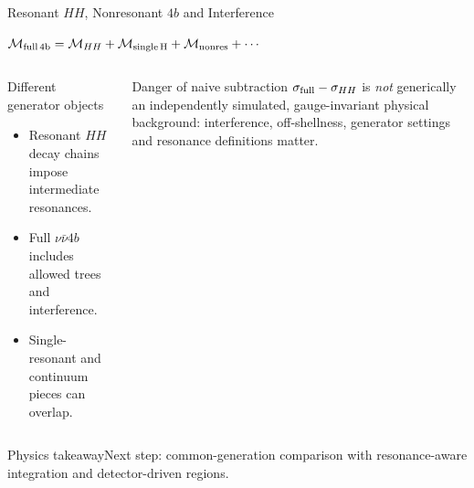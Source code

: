 \documentclass[aspectratio=1610,english]{beamer}
\newcommand{\src}[1]{\vfill{\par\color{black!65}\fontsize{6.4}{7.4}\selectfont\emph{Source:} #1\par}}
\newcommand{\key}[1]{\begin{alertblock}{Physics takeaway}\scriptsize #1\end{alertblock}}
\begin{document}
\begin{frame}[t]{Resonant $HH$, Nonresonant $4b$ and Interference}
\small

\begin{center}\large
$\mathcal M_{\rm full\,4b}=\mathcal M_{HH}+\mathcal M_{\rm single\,H}+\mathcal M_{\rm nonres}+\cdots$
\end{center}
\begin{columns}%
\begin{block}{Different generator objects}
\begin{itemize}\item Resonant $HH$ decay chains impose intermediate resonances.
\item Full $\nu\bar\nu4b$ includes allowed trees and interference.
\item Single-resonant and continuum pieces can overlap.
\end{itemize}\end{block}
\begin{alertblock}{Danger of naive subtraction}
$\sigma_{\rm full}-\sigma_{HH}$ is \emph{not} generically an independently simulated, gauge-invariant physical background: interference, off-shellness, generator settings and resonance definitions matter.
\end{alertblock}
\end{columns}
\key{Next step: common-generation comparison with resonance-aware integration and detector-driven regions.}

\end{frame}
\end{document}
